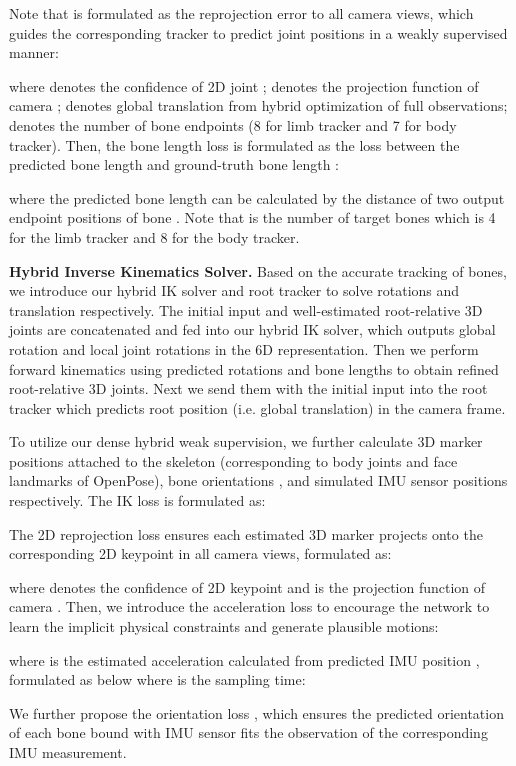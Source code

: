 \documentclass[letterpaper]{article} \usepackage{aaai23}  \usepackage{times}  \usepackage{helvet}  \usepackage{courier}  \usepackage[hyphens]{url}  \usepackage{graphicx} \urlstyle{rm} \def\UrlFont{\rm}  \usepackage{natbib}  \usepackage{caption} \frenchspacing  \setlength{\pdfpagewidth}{8.5in}  \setlength{\pdfpageheight}{11in}  \usepackage{algorithm}
\newcommand{\myparagraph}[1]{\vspace{0.1em}\noindent\textbf{#1}}
\begin{document}
Note that  is formulated as the reprojection error to all camera views, which guides the corresponding tracker to predict joint positions in a weakly supervised manner:

where  denotes the confidence of 2D joint ;  denotes the projection function of camera ;  denotes global translation from hybrid optimization of full observations;  denotes the number of bone endpoints (8 for limb tracker and 7 for body tracker). 
Then, the bone length loss is formulated as the  loss between the predicted bone length and ground-truth bone length :

where the predicted bone length can be calculated by the distance of two output endpoint positions  of bone . Note that  is the number of target bones which is 4 for the limb tracker and 8 for the body tracker.



\myparagraph{Hybrid Inverse Kinematics Solver.}
Based on the accurate tracking of bones, we introduce our hybrid IK solver and root tracker to solve rotations and translation respectively. The initial input and well-estimated root-relative 3D joints are concatenated and fed into our hybrid IK solver, which outputs global rotation and local joint rotations  in the 6D representation. Then we perform forward kinematics using predicted rotations  and bone lengths to obtain refined root-relative 3D joints. Next we send them with the initial input into the root tracker which predicts root position  (i.e. global translation) in the camera frame. 

To utilize our dense hybrid weak supervision, we
further
calculate  3D marker positions  attached to the skeleton (corresponding to body joints and face landmarks of OpenPose),  bone orientations , 
and  simulated IMU sensor positions  
respectively. The IK loss
is formulated as:

The 2D reprojection loss  ensures each estimated 3D marker  projects onto the corresponding 2D keypoint  in all camera views, formulated as:

where  denotes the confidence of 2D keypoint  and  is the projection function of camera .
Then, we introduce the acceleration loss  to encourage the network to learn the implicit physical constraints and generate plausible motions:

where  is the estimated acceleration calculated from predicted IMU position , formulated as below where  is the sampling time:

We further propose the orientation loss , which ensures the predicted orientation  of each bone bound with IMU sensor fits the observation  of the corresponding IMU measurement.
\end{document}

